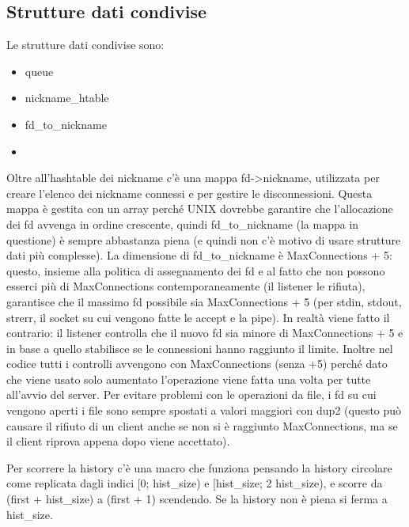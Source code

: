 \documentclass[a4paper]{article}
\theoremstyle{theorem}
\theoremstyle{remark}
\theoremstyle{definition}
\theoremstyle{corollary}
\theoremstyle{lemma}
\begin{document}
\subsection{Strutture dati condivise}\label{strutture-dati}
Le strutture dati condivise sono:
\begin{itemize}
	\item queue
	\item nickname\_htable
	\item fd\_to\_nickname
	\item 
\end{itemize}
Oltre all'hashtable dei nickname c'è una mappa fd->nickname, utilizzata per
creare l'elenco dei nickname connessi e per gestire le disconnessioni. Questa
mappa è gestita con un array perché UNIX dovrebbe garantire che l'allocazione
dei fd avvenga in ordine crescente, quindi fd\_to\_nickname (la mappa in questione)
è sempre abbastanza piena (e quindi non c'è motivo di usare strutture dati più
complesse). La dimensione di fd\_to\_nickname è MaxConnections + 5: questo,
insieme alla politica di assegnamento dei fd e al fatto che non possono esserci
più di MaxConnections contemporaneamente (il listener le rifiuta), garantisce
che il massimo fd possibile sia MaxConnections + 5 (per stdin, stdout, strerr,
il socket su cui vengono fatte le accept e la pipe). In realtà viene fatto il
contrario: il listener controlla che il nuovo fd sia minore di MaxConnections + 5
e in base a quello stabilisce se le connessioni hanno raggiunto il limite.
Inoltre nel codice tutti i controlli avvengono con MaxConnections (senza +5)
perché dato che viene usato solo aumentato l'operazione viene fatta una volta
per tutte all'avvio del server. Per evitare problemi con le operazioni da file,
i fd su cui vengono aperti i file sono sempre spostati a valori maggiori con
dup2 (questo può causare il rifiuto di un client anche se non si è raggiunto
MaxConnections, ma se il client riprova appena dopo viene accettato).

Per scorrere la history c'è una macro che funziona pensando la history
circolare come replicata dagli indici [0; hist\_size) e [hist\_size; 2 hist\_size),
e scorre da (first + hist\_size) a (first + 1) scendendo. Se la history non
è piena si ferma a hist\_size.
\end{document}
